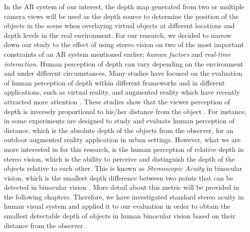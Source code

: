 \documentclass[dvips,letterpaper,12pt]{report}
\begin{document}
In the AR system of our interest, the depth map generated from two or multiple camera views will be used as the depth source to determine the position of the objects in the scene when
overlaying virtual objects at different locations and depth levels in the real environment. For our research, we decided to narrow down our study to the effect of using stereo vision
on two of the most important constraints of an AR system mentioned earlier; {\it human factors} and {\it real-time interaction}. {\newline}
Human perception of depth can vary depending on the environment and under different circumstances. Many studies have focused on the evaluation of human perception of depth within different frameworks
and in different applications, such as virtual reality, and augmented reality which have recently attracted more attention \cite{wann95,dras96,liv05,jer05,swa07,kru10}.
These studies show that the viewer perception of depth
is inversely proportional to his/her distance from the object \cite{kru10,swa07,jer05,liv05}. For instance, in \cite{swa07} some experiments are designed to study and evaluate human
perception of distance, which is the absolute depth of the objects from the observer, for an outdoor augmented reality application in urban settings. 
However, what we are more interested in for this research, is the human perception of relative depth in stereo vision, which is the ability to perceive and distinguish 
the depth of the objects relative to each other. This is known as {\it Stereoscopic Acuity} in binocular vision, which is the smallest depth difference between two points 
that can be detected in binocular vision \cite{pfa2000}. More detail about
this metric will be provided in the following chapters.
Therefore, we have investigated standard stereo acuity in human visual system and applied it to our evaluation in order to obtain the smallest detectable depth of 
objects in human binocular vision based on their distance from the observer.
\end{document}
